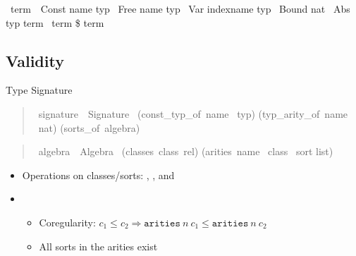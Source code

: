 \begin{frame}
    \begin{isabelle}
        \ term\ {\isacharequal}\ Const name typ\isanewline
        \isaindent{\ \ }{\isacharbar}\ Free name typ\isanewline
        \isaindent{\ \ }{\isacharbar}\ Var indexname typ\isanewline
        \isaindent{\ \ }{\isacharbar}\ Bound nat\isanewline
        \isaindent{\ \ }{\isacharbar}\ Abs typ term\isanewline
        \isaindent{\ \ }{\isacharbar}\ term \$ term
    \end{isabelle}
\end{frame}


\subsection{Validity}

\begin{frame}{Type Signature}
    \begin{quote}
        \begin{isabelle}
            \ signature\ {\isacharequal}\ Signature\ \isanewline
            \isaindent{\ \ }(const\_typ\_of{\isacharcolon}\ name \isasymrightharpoonup\ typ)\isanewline
            \isaindent{\ \ }(typ\_arity\_of{\isacharcolon}\ name \isasymrightharpoonup\ nat)\isanewline
            \isaindent{\ \ }(sorts\_of{\isacharcolon}\ algebra)
        \end{isabelle}
    \end{quote}
\end{frame}

\begin{frame}
    \begin{quote}
        \begin{isabelle}
            \ algebra\ {\isacharequal}\ Algebra\ \isanewline
            \isaindent{\ \ }(classes{\isacharcolon}\ class\ rel)\isanewline
            \isaindent{\ \ }(arities{\isacharcolon}\ name \isasymrightharpoonup\ class \isasymrightharpoonup\ sort list)
        \end{isabelle}
    \end{quote}
    \begin{itemize}
        \item Operations on classes/sorts: , , and 
        \item {}
            \begin{itemize}
                \item Coregularity: \(c_1 \leq c_2 \Longrightarrow \texttt{arities}\ n\ c_1 \leq \texttt{arities}\ n\ c_2\)
                \item All sorts in the arities exist
            \end{itemize}
    \end{itemize}
\end{frame}



